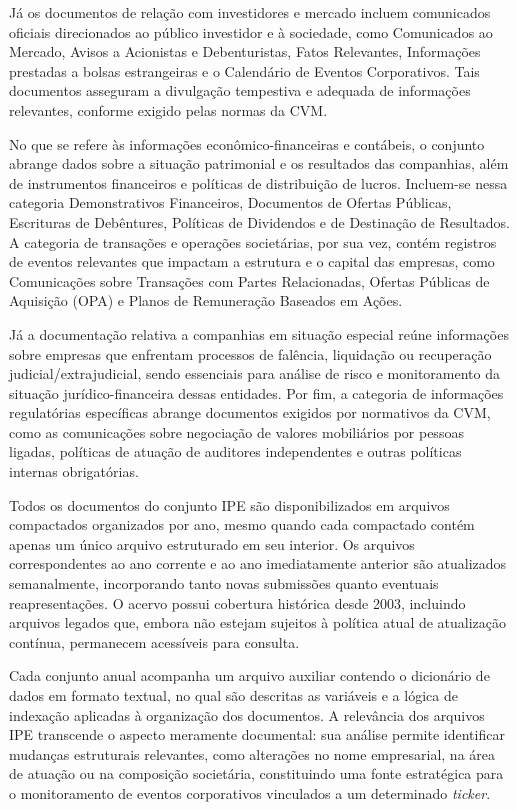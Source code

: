 Já os documentos de relação com investidores e mercado incluem comunicados oficiais direcionados ao público investidor e à sociedade, como Comunicados ao Mercado, Avisos a Acionistas e Debenturistas, Fatos Relevantes, Informações prestadas a bolsas estrangeiras e o Calendário de Eventos Corporativos. Tais documentos asseguram a divulgação tempestiva e adequada de informações relevantes, conforme exigido pelas normas da CVM.

No que se refere às informações econômico-financeiras e contábeis, o conjunto abrange dados sobre a situação patrimonial e os resultados das companhias, além de instrumentos financeiros e políticas de distribuição de lucros. Incluem-se nessa categoria Demonstrativos Financeiros, Documentos de Ofertas Públicas, Escrituras de Debêntures, Políticas de Dividendos e de Destinação de Resultados. A categoria de transações e operações societárias, por sua vez, contém registros de eventos relevantes que impactam a estrutura e o capital das empresas, como Comunicações sobre Transações com Partes Relacionadas, Ofertas Públicas de Aquisição (OPA) e Planos de Remuneração Baseados em Ações. 

Já a documentação relativa a companhias em situação especial reúne informações sobre empresas que enfrentam processos de falência, liquidação ou recuperação judicial/extrajudicial, sendo essenciais para análise de risco e monitoramento da situação jurídico-financeira dessas entidades. Por fim, a categoria de informações regulatórias específicas abrange documentos exigidos por normativos da CVM, como as comunicações sobre negociação de valores mobiliários por pessoas ligadas, políticas de atuação de auditores independentes e outras políticas internas obrigatórias.

Todos os documentos do conjunto IPE são disponibilizados em arquivos compactados organizados por ano, mesmo quando cada compactado contém apenas um único arquivo estruturado em seu interior. Os arquivos correspondentes ao ano corrente e ao ano imediatamente anterior são atualizados semanalmente, incorporando tanto novas submissões quanto eventuais reapresentações. O acervo possui cobertura histórica desde 2003, incluindo arquivos legados que, embora não estejam sujeitos à política atual de atualização contínua, permanecem acessíveis para consulta.

Cada conjunto anual acompanha um arquivo auxiliar contendo o dicionário de dados em formato textual, no qual são descritas as variáveis e a lógica de indexação aplicadas à organização dos documentos. A relevância dos arquivos IPE transcende o aspecto meramente documental: sua análise permite identificar mudanças estruturais relevantes, como alterações no nome empresarial, na área de atuação ou na composição societária, constituindo uma fonte estratégica para o monitoramento de eventos corporativos vinculados a um determinado \textit{ticker}.


